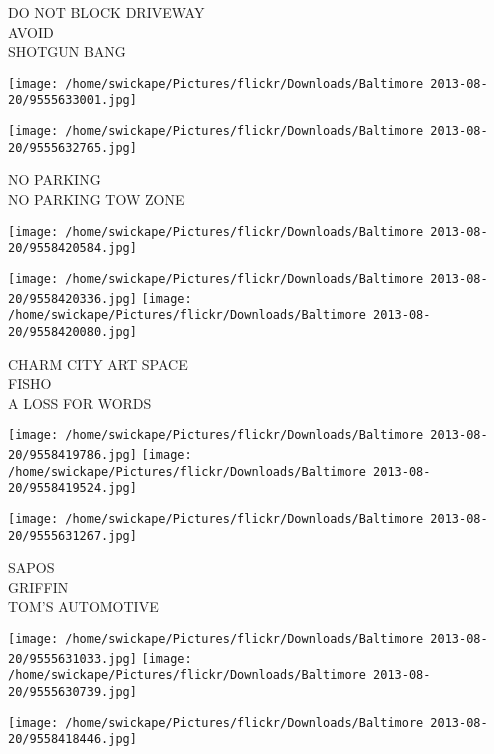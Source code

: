 \documentclass[10pt,letterpaper]{article}
\begin{document}
DO NOT BLOCK DRIVEWAY\\
AVOID\\
SHOTGUN BANG\\
\pagebreak

\texttt{[image: /home/swickape/Pictures/flickr/Downloads/Baltimore 2013-08-20/9555633001.jpg]}

\vspace{0.25in}
\texttt{[image: /home/swickape/Pictures/flickr/Downloads/Baltimore 2013-08-20/9555632765.jpg]}

NO PARKING\\
NO PARKING TOW ZONE\\
\pagebreak

\texttt{[image: /home/swickape/Pictures/flickr/Downloads/Baltimore 2013-08-20/9558420584.jpg]}

\vspace{0.25in}
\texttt{[image: /home/swickape/Pictures/flickr/Downloads/Baltimore 2013-08-20/9558420336.jpg]}
\texttt{[image: /home/swickape/Pictures/flickr/Downloads/Baltimore 2013-08-20/9558420080.jpg]}

CHARM CITY ART SPACE\\
FISHO\\
A LOSS FOR WORDS\\
\pagebreak

\texttt{[image: /home/swickape/Pictures/flickr/Downloads/Baltimore 2013-08-20/9558419786.jpg]}
\texttt{[image: /home/swickape/Pictures/flickr/Downloads/Baltimore 2013-08-20/9558419524.jpg]}

\vspace{0.25in}
\texttt{[image: /home/swickape/Pictures/flickr/Downloads/Baltimore 2013-08-20/9555631267.jpg]}

SAPOS\\
GRIFFIN\\
TOM'S AUTOMOTIVE\\
\pagebreak

\texttt{[image: /home/swickape/Pictures/flickr/Downloads/Baltimore 2013-08-20/9555631033.jpg]}
\texttt{[image: /home/swickape/Pictures/flickr/Downloads/Baltimore 2013-08-20/9555630739.jpg]}

\vspace{0.25in}
\texttt{[image: /home/swickape/Pictures/flickr/Downloads/Baltimore 2013-08-20/9558418446.jpg]}
\end{document}
